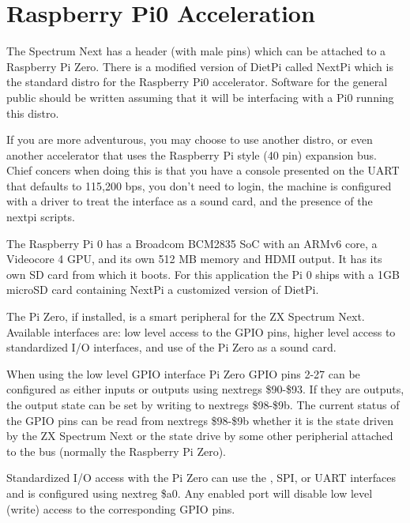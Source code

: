 \chapter{Raspberry Pi0 Acceleration}
The Spectrum Next has a header (with male pins) which can be attached
to a Raspberry Pi Zero. There is a modified version of DietPi called
NextPi which is the standard distro for the Raspberry Pi0
accelerator. Software for the general public should be written
assuming that it will be interfacing with a Pi0 running this distro.

If you are more adventurous, you may choose to use another distro, or
even another accelerator that uses the Raspberry Pi style (40 pin)
expansion bus.  Chief concers when doing this is that you have a
console presented on the UART that defaults to 115,200 bps, you don't
need to login, the machine is configured with a driver to treat the
\iis interface as a sound card, and the presence of the nextpi
scripts.

The Raspberry Pi 0 has a Broadcom BCM2835 SoC with an ARMv6 core, a
Videocore 4 GPU, and its own 512 MB memory and HDMI output. It has its
own SD card from which it boots. For this application the Pi 0 ships
with a 1GB microSD card containing NextPi a customized version of
DietPi.

The Pi Zero, if installed, is a smart peripheral for the ZX Spectrum
Next. Available interfaces are: low level access to the GPIO pins,
higher level access to standardized I/O interfaces, and use of the Pi
Zero as a sound card.

When using the low level GPIO interface Pi Zero GPIO pins 2-27 can be
configured as either inputs or outputs using nextregs \$90-\$93. If
they are outputs, the output state can be set by writing to nextregs
\$98-\$9b. The current status of the GPIO pins can be read from
nextregs \$98-\$9b whether it is the state driven by the ZX Spectrum
Next or the state drive by some other peripherial attached to the bus
(normally the Raspberry Pi Zero).










Standardized I/O access with the Pi Zero can use the \iic, SPI, or
UART interfaces and is configured using nextreg \$a0. Any enabled port
will disable low level (write) access to the corresponding GPIO
pins.

